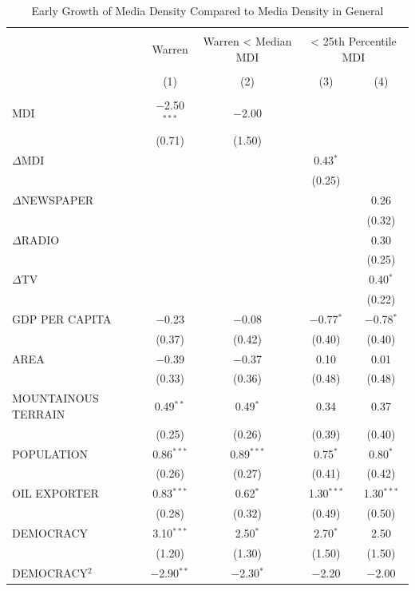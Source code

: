 \documentclass[11pt,article,oneside]{memoir}
\begin{document}
\begin{table}[!htbp] \centering 
  \caption{Early Growth of Media Density Compared to Media Density in General} 
  \label{} 
\footnotesize 
\begin{tabular}{@{\extracolsep{5pt}}lcccc} 
\\[-1.8ex]\hline \\[-1.8ex] 
 & Warren & Warren < Median MDI & \multicolumn{2}{c}{< 25th Percentile MDI} \\ 
\\[-1.8ex] & (1) & (2) & (3) & (4)\\ 
\hline \\[-1.8ex] 
 MDI & $-$2.50$^{***}$ & $-$2.00 &  &  \\ 
  & (0.71) & (1.50) &  &  \\ 
  $\Delta$MDI &  &  & 0.43$^{*}$ &  \\ 
  &  &  & (0.25) &  \\ 
  $\Delta$NEWSPAPER &  &  &  & 0.26 \\ 
  &  &  &  & (0.32) \\ 
  $\Delta$RADIO &  &  &  & 0.30 \\ 
  &  &  &  & (0.25) \\ 
  $\Delta$TV &  &  &  & 0.40$^{*}$ \\ 
  &  &  &  & (0.22) \\ 
  GDP PER CAPITA & $-$0.23 & $-$0.08 & $-$0.77$^{*}$ & $-$0.78$^{*}$ \\ 
  & (0.37) & (0.42) & (0.40) & (0.40) \\ 
  AREA & $-$0.39 & $-$0.37 & 0.10 & 0.01 \\ 
  & (0.33) & (0.36) & (0.48) & (0.48) \\ 
  MOUNTAINOUS TERRAIN & 0.49$^{**}$ & 0.49$^{*}$ & 0.34 & 0.37 \\ 
  & (0.25) & (0.26) & (0.39) & (0.40) \\ 
  POPULATION & 0.86$^{***}$ & 0.89$^{***}$ & 0.75$^{*}$ & 0.80$^{*}$ \\ 
  & (0.26) & (0.27) & (0.41) & (0.42) \\ 
  OIL EXPORTER & 0.83$^{***}$ & 0.62$^{*}$ & 1.30$^{***}$ & 1.30$^{***}$ \\ 
  & (0.28) & (0.32) & (0.49) & (0.50) \\ 
  DEMOCRACY & 3.10$^{***}$ & 2.50$^{*}$ & 2.70$^{*}$ & 2.50 \\ 
  & (1.20) & (1.30) & (1.50) & (1.50) \\ 
  DEMOCRACY$^2$ & $-$2.90$^{**}$ & $-$2.30$^{*}$ & $-$2.20 & $-$2.00 \\ 

\end{tabular}
\end{table}
\end{document}
